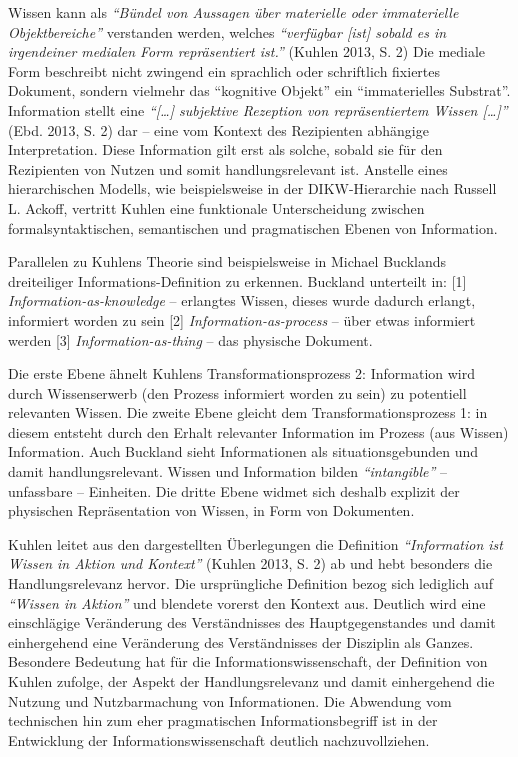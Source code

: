\documentclass[a4paper,
fontsize=11pt,
oneside,
numbers=noperiodatend,
parskip=half-,
bibliography=totoc,
final
]{scrartcl}
\begin{document}
Wissen kann als \emph{\enquote{Bündel von Aussagen über materielle oder
immaterielle Objektbereiche}} verstanden werden, welches
\emph{\enquote{verfügbar {[}ist{]} sobald es in irgendeiner medialen
Form repräsentiert ist.}} (Kuhlen 2013, S. 2) Die mediale Form
beschreibt nicht zwingend ein sprachlich oder schriftlich fixiertes
Dokument, sondern vielmehr das \enquote{kognitive Objekt} ein
\enquote{immaterielles Substrat}. Information stellt eine
\emph{\enquote{{[}\ldots{}{]} subjektive Rezeption von repräsentiertem
Wissen {[}\ldots{}{]}}} (Ebd. 2013, S. 2) dar -- eine vom Kontext des
Rezipienten abhängige Interpretation. Diese Information gilt erst als
solche, sobald sie für den Rezipienten von Nutzen und somit
handlungsrelevant ist. Anstelle eines hierarchischen Modells, wie
beispielsweise in der DIKW-Hierarchie nach Russell L. Ackoff, vertritt
Kuhlen eine funktionale Unterscheidung zwischen formalsyntaktischen,
semantischen und pragmatischen Ebenen von Information.

Parallelen zu Kuhlens Theorie sind beispielsweise in Michael Bucklands
dreiteiliger Informations-Definition zu erkennen. Buckland unterteilt
in: {[}1{]} \emph{Information-as-knowledge} -- erlangtes Wissen, dieses
wurde dadurch erlangt, informiert worden zu sein {[}2{]}
\emph{Information-as-process} -- über etwas informiert werden {[}3{]}
\emph{Information-as-thing} -- das physische Dokument.

Die erste Ebene ähnelt Kuhlens Transformationsprozess 2: Information
wird durch Wissenserwerb (den Prozess informiert worden zu sein) zu
potentiell relevanten Wissen. Die zweite Ebene gleicht dem
Transformationsprozess 1: in diesem entsteht durch den Erhalt relevanter
Information im Prozess (aus Wissen) Information. Auch Buckland sieht
Informationen als situationsgebunden und damit handlungsrelevant. Wissen
und Information bilden \emph{\enquote{intangible}} -- unfassbare --
Einheiten. Die dritte Ebene widmet sich deshalb explizit der physischen
Repräsentation von Wissen, in Form von Dokumenten.

Kuhlen leitet aus den dargestellten Überlegungen die Definition
\emph{\enquote{Information ist Wissen in Aktion und Kontext}} (Kuhlen
2013, S. 2) ab und hebt besonders die Handlungsrelevanz hervor. Die
ursprüngliche Definition bezog sich lediglich auf \emph{\enquote{Wissen
in Aktion}} und blendete vorerst den Kontext aus. Deutlich wird eine
einschlägige Veränderung des Verständnisses des Hauptgegenstandes und
damit einhergehend eine Veränderung des Verständnisses der Disziplin als
Ganzes. Besondere Bedeutung hat für die Informationswissenschaft, der
Definition von Kuhlen zufolge, der Aspekt der Handlungsrelevanz und
damit einhergehend die Nutzung und Nutzbarmachung von Informationen. Die
Abwendung vom technischen hin zum eher pragmatischen Informationsbegriff
ist in der Entwicklung der Informationswissenschaft deutlich
nachzuvollziehen.
\end{document}

